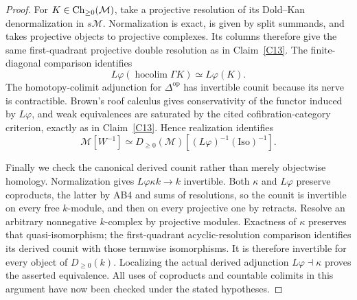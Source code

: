 \begin{proof}
For $K\in\operatorname{Ch}_{\geq0}(\mathcal M)$, take a projective resolution of its Dold--Kan denormalization in $s\mathcal M$. Normalization is exact, is given by split summands, and takes projective objects to projective complexes. Its columns therefore give the same first-quadrant projective double resolution as in Claim~\ref{C13}. The finite-diagonal comparison identifies
\[
 L\varphi(\operatorname{hocolim}\Gamma K)\simeq L\varphi(K).
\]
The homotopy-colimit adjunction for $\Delta^{\mathrm{op}}$ has invertible counit because its nerve is contractible. Brown's roof calculus gives conservativity of the functor induced by $L\varphi$, and weak equivalences are saturated by the cited cofibration-category criterion, exactly as in Claim~\ref{C13}. Hence realization identifies
\[
 \mathcal M[W^{-1}]
 \simeq D_{\geq0}(\mathcal M)[(L\varphi)^{-1}(\mathrm{Iso})^{-1}].
\]

Finally we check the canonical derived counit rather than merely objectwise homology. Normalization gives $L\varphi\kappa k\to k$ invertible. Both $\kappa$ and $L\varphi$ preserve coproducts, the latter by AB4 and sums of resolutions, so the counit is invertible on every free $k$-module, and then on every projective one by retracts. Resolve an arbitrary nonnegative $k$-complex by projective modules. Exactness of $\kappa$ preserves that quasi-isomorphism; the first-quadrant acyclic-resolution comparison identifies its derived counit with those termwise isomorphisms. It is therefore invertible for every object of $D_{\geq0}(k)$. Localizing the actual derived adjunction $L\varphi\dashv\kappa$ proves the asserted equivalence. All uses of coproducts and countable colimits in this argument have now been checked under the stated hypotheses.
\end{proof}


